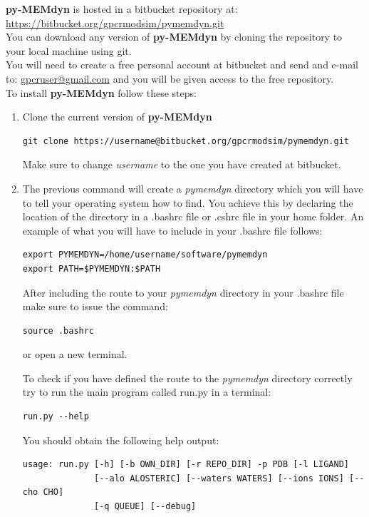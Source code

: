 \documentclass[10pt, oneside, pdftex]{article}
\begin{document}
\noindent \textbf{py-MEMdyn} is hosted in a bitbucket repository at:\\

\noindent \url{https://bitbucket.org/gpcrmodsim/pymemdyn.git}\\

\noindent  You  can  download  any version  of  \textbf{py-MEMdyn}  by
cloning the repository to your local machine using git.\\

\noindent You will need to create a free personal account at bitbucket
and send and e-mail to: \url{gpcruser@gmail.com} and you will be given
access to the free repository.\\

\noindent To install \textbf{py-MEMdyn} follow these steps:
\begin{enumerate}
\item{Clone the current version of \textbf{py-MEMdyn}
\begin{Verbatim}
git clone https://username@bitbucket.org/gpcrmodsim/pymemdyn.git
\end{Verbatim}
Make sure to change \textit{username} to the one you have created 
at bitbucket.}

\item{The previous  command will create a  \textit{pymemdyn} directory
  which you will  have to tell your operating system  how to find. You
  achieve this by declaring the location of the directory in a .bashrc 
file or .cshrc file in your home folder. An example of what you will 
have to include in your .bashrc file follows:
\begin{Verbatim}
export PYMEMDYN=/home/username/software/pymemdyn
export PATH=$PYMEMDYN:$PATH
\end{Verbatim}
}
After including the route to your \textit{pymemdyn} directory in your
.bashrc file make sure to issue the command:
\begin{Verbatim}
source .bashrc
\end{Verbatim}
or open a new terminal.

To check if you have defined the route to the \textit{pymemdyn} 
directory correctly try to run the main program called run.py in
a terminal:
\begin{Verbatim}
run.py --help
\end{Verbatim}
You should obtain the following help output:
\begin{Verbatim}
usage: run.py [-h] [-b OWN_DIR] [-r REPO_DIR] -p PDB [-l LIGAND]
              [--alo ALOSTERIC] [--waters WATERS] [--ions IONS] [--cho CHO]
              [-q QUEUE] [--debug]


\end{Verbatim}
\end{enumerate}
\end{document}
